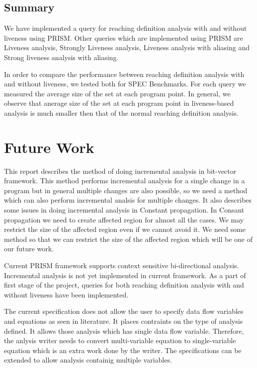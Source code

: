 \documentclass[11pt,a4paper,openright]{report}
\begin{document}
\section{Summary}
We have implemented a query for reaching definition analysis with and without liveness using PRISM. Other queries which are 
implemented using PRISM are Liveness analysis, Strongly Liveness analysis, Liveness analysis with aliasing
and Strong liveness analysis with aliasing. 

In order to compare the performance between reaching definition analysis with and without liveness, we tested both for SPEC Benchmarks.
For each query we measured the average size of the set at each program point. In general, we observe that anerage size of the set at each program 
point in liveness-based analysis is much smaller then that of the normal reaching definition analysis.



\chapter{Future Work}
 
This report describes the method of doing incremental analysis in bit-vector framework. This method performs incremental analysis for a single change in a program
but in general multiple changes are also possible, so we need a method which can also perform incremental analsis for multiple changes.
It also describes some issues in doing incremental analysis in Constant propagation. In Consant propagation we need to create affected region for almost all the cases.
We may restrict the size of the affected region even if we cannot avoid it. We need some method so that we can restrict the size of the affected region which will be one 
of our future work.

Current PRISM framework supports context sensitive bi-directional analysis. Incremental analysis is not yet implemented in current framework. As a part
of first stage of the project, queries for both reaching definition analysis with and without liveness have been implemented.

The current specification does not allow the user to specify data flow variables and equations as seen in literature. It places contraints on the type of analysis 
defined. It allows those analysis which has single data flow variable. Therefore, the anlysis writer needs to convert multi-variable equation to single-variable 
equation which is an extra work done by the writer. The specifications can be extended to allow analysis containig multiple variables.
\end{document}
